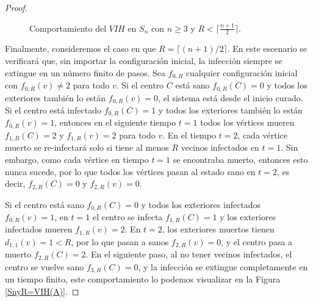 \documentclass[12pt,titlepage,twoside,openright]{book}
\begin{document}
\begin{proof}
\begin{figure}[h]
\begin{subfigure}[h]{0.5\linewidth}
    \end{subfigure}
    \caption{Comportamiento del $VIH$ en $S_n$ con $n\geq3$ y $R<\lceil \frac{n+1}{2} \rceil$.}
    \label{SnyR<vih}
    \end{figure}
    Finalmente, consideremos el caso en que $R= \lceil (n+1)/2\rceil$. En este escenario se verificar\'a que, sin importar la configuraci\'on inicial, la infecci\'on siempre se extingue en un n\'umero finito de pasos. Sea $f_{0,R}$ cualquier configuraci\'on inicial con $f_{0,R}(v)\neq 2$ para todo $v$. Si el centro $C$ est\'a sano $f_{0,R}(C)=0$ y todos los exteriores tambi\'en lo est\'an $f_{0,R}(v)=0$, el sistema est\'a desde el inicio curado. Si el centro est\'a infectado $f_{0,R}(C)=1$ y todos los exteriores tambi\'en lo est\'an $f_{0,R}(v)=1$, entonces en el siguiente tiempo $t=1$ todos los v\'ertices mueren $f_{1,R}(C)=2$ y $f_{1,R}(v)=2$ para todo $v$. En el tiempo $t=2$, cada v\'ertice muerto se re-infectar\'a solo si tiene al menos $R$ vecinos infectados en $t=1$. Sin embargo, como cada v\'ertice en tiempo $t=1$ se encontraba muerto, entonces esto nunca sucede, por lo que todos los v\'ertices pasan al estado sano en $t=2$, es decir, $f_{2,R}(C)=0$ y $f_{2,R}(v)=0$. 
    
    Si el centro est\'a sano $f_{0,R}(C)=0$ y todos los exteriores infectados $f_{0,R}(v)=1$, en $t=1$ el centro se infecta $f_{1,R}(C)=1$ y los exteriores infectados mueren $f_{1,R}(v)=2$. En $t=2$, los exteriores muertos tienen $d_{1,1}(v)=1<R$, por lo que pasan a sanos $f_{2,R}(v)=0$, y el centro pasa a muerto $f_{2,R}(C)=2$. En el siguiente paso, al no tener vecinos infectados, el centro se vuelve sano $f_{3,R}(C)=0$, y la infecci\'on se extingue completamente en un tiempo finito, este comportamiento lo podemos visualizar en la Figura \ref{SnyR=VIH(A)}. 
    

\end{proof}
\end{document}
